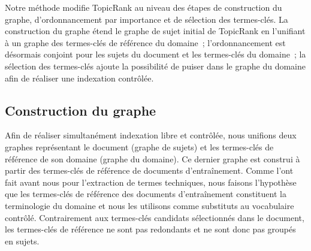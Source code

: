   Notre méthode modifie TopicRank au niveau des étapes de construction du
  graphe, d'ordonnancement par importance et de sélection des termes-clés. La
  construction du graphe étend le graphe de sujet initial de TopicRank en
  l'unifiant à un graphe des termes-clés de référence du domaine~;
  l'ordonnancement est désormais conjoint pour les sujets du document et les
  termes-clés du domaine~; la sélection des termes-clés ajoute la possibilité de
  puiser dans le graphe du domaine afin de réaliser une indexation contrôlée.

  \subsection{Construction du graphe}
  \label{subsec:main-domain_specific_keyphrase_annotation-supervised_automatic_keyphrase_extraction-topiccorank-graph_construction}
    Afin de réaliser simultanément indexation libre et contrôlée, nous unifions
    deux graphes représentant le document (graphe de sujets) et les termes-clés
    de référence de son domaine (graphe du domaine). Ce dernier graphe est
    construi à partir des termes-clés de référence de documents d'entraînement.
    Comme  l'ont fait avant nous
    pour l'extraction de termes techniques, nous faisons l'hypothèse que les
    termes-clés de référence des documents d'entraînement constituent la
    terminologie du domaine et nous les utilisons comme substituts au
    vocabulaire contrôlé. Contrairement aux termes-clés candidats sélectionnés
    dans le document, les termes-clés de référence ne sont pas redondants et ne
    sont donc pas groupés en sujets.

